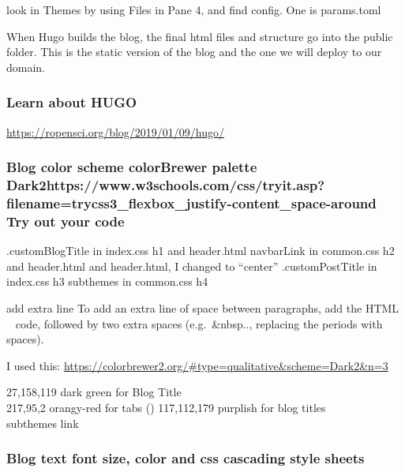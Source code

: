 \documentclass[
]{article}
\begin{document}
look in Themes by using Files in Pane 4, and find config. One is
params.toml

When Hugo builds the blog, the final html files and structure go into
the public folder. This is the static version of the blog and the one we
will deploy to our domain.

\hypertarget{learn-about-hugo}{%
\subsubsection{Learn about HUGO}\label{learn-about-hugo}}

\url{https://ropensci.org/blog/2019/01/09/hugo/}

\hypertarget{blog-color-scheme-colorbrewer-palette-dark2httpswww.w3schools.comcsstryit.aspfilenametrycss3_flexbox_justify-content_space-around-try-out-your-code}{%
\subsubsection{Blog color scheme colorBrewer palette
Dark2https://www.w3schools.com/css/tryit.asp?filename=trycss3\_flexbox\_justify-content\_space-around
Try out your
code}\label{blog-color-scheme-colorbrewer-palette-dark2httpswww.w3schools.comcsstryit.aspfilenametrycss3_flexbox_justify-content_space-around-try-out-your-code}}

.customBlogTitle in index.css h1 and header.html navbarLink in
common.css h2 and header.html and header.html, I changed to ``center''
.customPostTitle in index.css h3 subthemes in common.css h4

add extra line To add an extra line of space between paragraphs, add the
HTML ~ code, followed by two extra spaces (e.g.~\&nbsp.., replacing the
periods with spaces).

I used this:
\url{https://colorbrewer2.org/\#type=qualitative\&scheme=Dark2\&n=3}

27,158,119 dark green for Blog Title\\
217,95,2 orangy-red for tabs () 117,112,179 purplish for blog titles\\
subthemes link

\hypertarget{blog-text-font-size-color-and-css-cascading-style-sheets}{%
\subsubsection{Blog text font size, color and css cascading style
sheets}\label{blog-text-font-size-color-and-css-cascading-style-sheets}}
\end{document}
